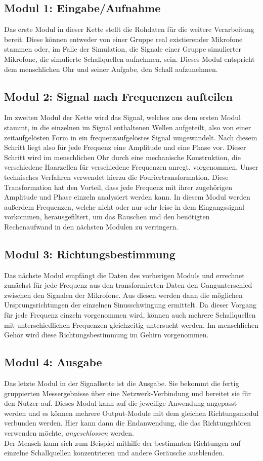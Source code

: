 \subsection{Modul 1: Eingabe/Aufnahme}
Das erste Modul in dieser Kette stellt die Rohdaten für die weitere Verarbeitung bereit. Diese  können entweder von einer Gruppe real existierender Mikrofone stammen oder, im Falle der Simulation, die Signale einer Gruppe simulierter Mikrofone, die simulierte Schallquellen aufnehmen, sein. Dieses Modul entspricht dem menschlichen Ohr und seiner Aufgabe, den Schall aufzunehmen. 

\subsection{Modul 2: Signal nach Frequenzen aufteilen}
Im zweiten Modul der Kette wird das Signal, welches aus dem ersten Modul stammt, in die einzelnen im Signal enthaltenen Wellen aufgeteilt, also von einer zeitaufgelösten Form in ein frequenzaufgelöstes Signal umgewandelt. Nach diesem Schritt liegt also für jede Frequenz eine Amplitude und eine Phase vor. Dieser Schritt wird im menschlichen Ohr durch eine mechanische Konstruktion, die verschiedene Haarzellen für verschiedene Frequenzen anregt, vorgenommen. Unser technisches Verfahren verwendet hierzu die Fouriertransformation. Diese Transformation hat den Vorteil, dass jede Frequenz mit ihrer zugehörigen Amplitude und Phase einzeln analysiert werden kann.
In diesem Modul werden außerdem Frequenzen, welche nicht oder nur sehr leise in dem Eingangssignal vorkommen, herausgefiltert, um das Rauschen und den benötigten Rechenaufwand in den nächsten Modulen zu verringern.

\subsection{Modul 3: Richtungsbestimmung}
Das nächste Modul empfängt die Daten des vorherigen Moduls und errechnet zunächst für jede Frequenz aus den transformierten Daten den Gangunterschied zwischen den Signalen der Mikrofone. Aus diesen werden dann die möglichen Ursprungsrichtungen der einzelnen Sinusschwingung ermittelt. Da dieser Vorgang für jede Frequenz einzeln vorgenommen wird, können auch mehrere Schallquellen mit unterschiedlichen Frequenzen gleichzeitig untersucht werden. Im menschlichen Gehör wird diese Richtungsbestimmung im Gehirn vorgenommen.

\subsection{Modul 4: Ausgabe}
Das letzte Modul in der Signalkette ist die Ausgabe. Sie bekommt die fertig gruppierten Messergebnisse über eine Netzwerk-Verbindung und bereitet sie für den Nutzer auf. Dieses Modul kann auf die jeweilige Anwendung angepasst werden und es können mehrere Output-Module mit dem gleichen Richtungsmodul verbunden werden. Hier kann dann die Endanwendung, die das Richtungshören verwenden möchte, \textit{angeschlossen} werden.\\
Der Mensch kann sich zum Beispiel mithilfe der bestimmten Richtungen auf einzelne Schallquellen konzentrieren und andere Geräusche ausblenden.